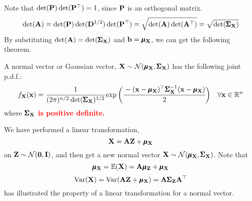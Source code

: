      Note that $\det(\mathbf{P})\det(\mathbf{P}^{\top}) = 1$, since $\mathbf{P}$ is an orthogonal matrix.
     \begin{equation*}
         \det({\mathbf{A}}) = \det(\mathbf{P})\det(\mathbf{D}^{1/2})\det(\mathbf{P}^{\top}) = \sqrt{\det(\mathbf{A})\det(\mathbf{A}^{\top})} = \sqrt{\det(\pmb{\Sigma}_{\mathbf{X}})}
     \end{equation*}
     By substituting $\det(\mathbf{A}) = \det(\pmb{\Sigma}_{\mathbf{X}})$ and $\mathbf{b} = \pmb{\mu}_{\mathbf{X}}$, we can get the following theorem.
     \begin{Thm}\label{Normal-vector-pdf}
         A normal vector or Gaussian vector, $\mathbf{X}\sim\mathcal{N}(\pmb{\mu}_{\mathbf{X}}, \pmb{\Sigma}_{\mathbf{X}})$ has the following joint p.d.f.:
         \begin{equation}
             \pdfn{X} = \cfrac{1}{(2\pi)^{n/2}\det(\covmatX{X})^{1/2} }\exp\bigg(\cfrac{-\T{(\B{x} - \muX{X})}\covmatX{X}^{-1}(\B{x} - \muX{X})}{2}  \bigg)\quad \forall \B{x}\in\Rn
         \end{equation}\label{eq-normal-vector}
         where \textbf{\textcolor{red}{$\pmb{\Sigma}_{\mathbf{X}}$ is positive definite.}}
     \end{Thm}
     \begin{Rem}
         We have performed a linear transformation,
         \begin{equation}
             \mathbf{X} = \mathbf{A}\mathbf{Z} + \pmb{\mu}_{\mathbf{X}}
         \end{equation} on $\mathbf{Z}\sim \mathcal{N}(\mathbf{0}, \mathbf{I})$, and then get a new normal vector $\mathbf{X}\sim\mathcal{N}(\pmb{\mu}_{\mathbf{X}}, \pmb{\Sigma}_{\mathbf{X}})$. Note that 
         \begin{equation*}
             \pmb{\mu}_{\mathbf{X}} = \mathbb{E}(\mathbf{X}) = \mathbf{A}\pmb{\mu}_{\mathbf{Z}} + \pmb{\mu}_{\mathbf{X}}
         \end{equation*}
         \begin{equation*}
             \text{Var}(\mathbf{X}) = \text{Var}(\mathbf{A}\mathbf{Z} + \pmb{\mu}_{\mathbf{X}})= \mathbf{A}\pmb{\Sigma}_{\mathbf{Z}}\mathbf{A}^{\top}
         \end{equation*}
         has illustrated the property of a linear transformation for a normal vector.
     \end{Rem}

